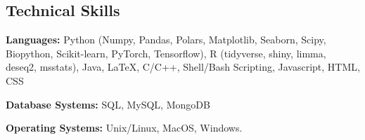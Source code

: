 \documentclass[margin,line]{res}
\begin{document}
\begin{resume}
\section{\sc Technical Skills}
\begin{list2}
\item {\bf Languages:}  Python (Numpy, Pandas, Polars, Matplotlib, Seaborn, Scipy, Biopython, Scikit-learn, PyTorch, Tensorflow), R (tidyverse, shiny, limma, deseq2, msstats), Java, \LaTeX{}, C/C++, Shell/Bash Scripting, Javascript, HTML, CSS
\item {\bf Database Systems:} SQL, MySQL, MongoDB
\item {\bf Operating Systems:}  Unix/Linux, MacOS, Windows.
\end{list2}



\end{resume}
\end{document}
